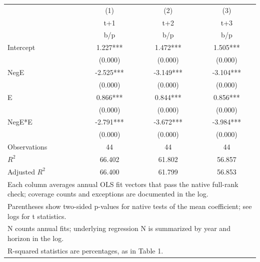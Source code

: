 {
\def\sym#1{\ifmmode^{#1}\else\(^{#1}\)\fi}
\begin{tabular}{l*{3}{c}}
\hline\hline
                    &\multicolumn{1}{c}{(1)}&\multicolumn{1}{c}{(2)}&\multicolumn{1}{c}{(3)}\\
                    &\multicolumn{1}{c}{t+1}&\multicolumn{1}{c}{t+2}&\multicolumn{1}{c}{t+3}\\
                    &         b/p   &         b/p   &         b/p   \\
\hline
Intercept           &       1.227***&       1.472***&       1.505***\\
                    &     (0.000)   &     (0.000)   &     (0.000)   \\
NegE                &      -2.525***&      -3.149***&      -3.104***\\
                    &     (0.000)   &     (0.000)   &     (0.000)   \\
E                   &       0.866***&       0.844***&       0.856***\\
                    &     (0.000)   &     (0.000)   &     (0.000)   \\
NegE*E              &      -2.791***&      -3.672***&      -3.984***\\
                    &     (0.000)   &     (0.000)   &     (0.000)   \\
\hline
Observations        &          44   &          44   &          44   \\
\(R^{2}\)           &      66.402   &      61.802   &      56.857   \\
Adjusted \(R^{2}\)  &      66.400   &      61.799   &      56.853   \\
\hline\hline
\multicolumn{4}{l}{\footnotesize Each column averages annual OLS fit vectors that pass the native full-rank check; coverage counts and exceptions are documented in the log.}\\
\multicolumn{4}{l}{\footnotesize Parentheses show two-sided p-values for native tests of the mean coefficient; see logs for t statistics.}\\
\multicolumn{4}{l}{\footnotesize N counts annual fits; underlying regression N is summarized by year and horizon in the log.}\\
\multicolumn{4}{l}{\footnotesize R-squared statistics are percentages, as in Table 1.}\\
\end{tabular}
}
